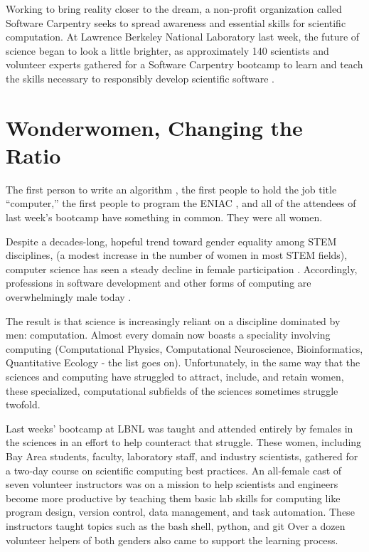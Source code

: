 \documentclass[letterpaper]{article}
\begin{document}
Working to bring reality closer to the dream, a non-profit organization called 
Software Carpentry \cite{wilson_software_2014} seeks to spread awareness and 
essential skills for scientific computation. At Lawrence Berkeley National 
Laboratory last week, the future of science began to look a little brighter, as 
approximately 140 scientists and volunteer experts gathered for a Software 
Carpentry bootcamp to learn and teach the skills necessary to responsibly 
develop scientific software \cite{huff_software_2014}.

\section*{Wonderwomen, Changing the Ratio}
The first person to write an algorithm \cite{toole_ada_1992}, the first people to hold 
the job title ``computer,'' the first people to program the 
ENIAC \cite{grier_when_2013}, and all of the attendees of last week's bootcamp have 
something in common. They were all women.  

Despite a decades-long, hopeful trend toward gender equality among STEM disciplines, 
(a modest increase in the number of women in most STEM fields), 
computer science has seen a steady decline in female participation 
\cite{nsf_women_2013}.
Accordingly, professions in software development and other forms of computing 
are overwhelmingly male today \cite{margolis_unlocking_2003}.

The result is that science is increasingly reliant on a discipline dominated by 
men: computation.  Almost every domain now boasts a speciality involving 
computing (Computational Physics, Computational Neuroscience, Bioinformatics, 
Quantitative Ecology - the list goes on). Unfortunately, in the same way that 
the sciences and computing have struggled to attract, include, and retain women, 
these specialized, computational subfields of the sciences sometimes struggle 
twofold.  

Last weeks' bootcamp at LBNL was taught and attended entirely by females in the 
sciences in an effort to help counteract that struggle. These women, including 
Bay Area students, faculty, laboratory staff, and industry scientists, gathered 
for a two-day course on scientific computing best practices.  An all-female cast 
of seven volunteer instructors was on a mission to help scientists and engineers 
become more productive by teaching them basic lab skills for computing like 
program design, version control, data management, and task automation.  These 
instructors taught topics such as the bash shell, python, and git 
Over a dozen volunteer helpers of both genders also came to support the learning 
process.
\end{document}
